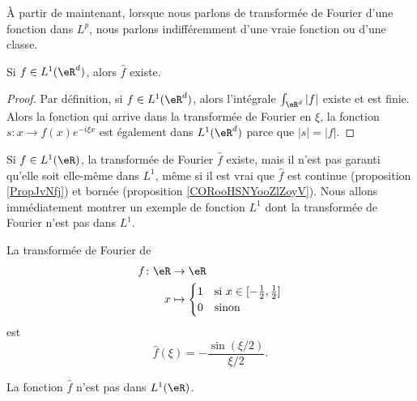 À partir de maintenant, lorsque nous parlons de transformée de Fourier d'une fonction dans \( L^p\), nous parlons indifféremment d'une vraie fonction ou d'une classe.

\begin{lemma}
	Si \( f\in L^1(\eR^d)\), alors \( \hat f\) existe.
\end{lemma}

\begin{proof}
	Par définition, si \( f\in L^1(\eR^d)\), alors l'intégrale \( \int_{\eR^d}| f |\) existe et est finie. Alors la fonction qui arrive dans la transformée de Fourier en \( \xi\), la fonction \( s\colon x\to f(x) e^{-i\xi x}\) est également dans \( L^1(\eR^d)\) parce que \( | s |=| f |\).
\end{proof}

\begin{normaltext}
	Si \( f\in L^1(\eR)\), la transformée de Fourier \( \hat f\) existe, mais il n'est pas garanti qu'elle soit elle-même dans \( L^1\), même si il est vrai que \( \hat f\) est continue (proposition \ref{PropJvNfj}) et bornée (proposition \ref{CORooHSNYooZlZoyV}). Nous allons immédiatement montrer un exemple de fonction \( L^1\) dont la transformée de Fourier n'est pas dans \( L^1\).
\end{normaltext}

\begin{lemma}       \label{LEMooROPHooOSguhN}
	La transformée de Fourier de
	\begin{equation}
		\begin{aligned}
			f\colon \eR & \to \eR                                                                                             \\
			x           & \mapsto \begin{cases}
				                      1 & \text{si } x\in \mathopen[ -\frac{ 1 }{2} , \frac{ 1 }{2} \mathclose] \\
				                      0 & \text{sinon }
			                      \end{cases}
		\end{aligned}
	\end{equation}
	est
	\begin{equation}
		\hat f(\xi)=-\frac{ \sin(\xi/2) }{ \xi/2 }.
	\end{equation}

	La fonction \( \hat f\) n'est pas dans \( L^1(\eR)\).
\end{lemma}

